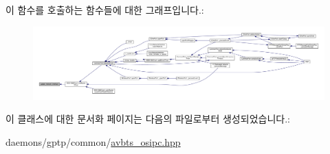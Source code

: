 이 함수를 호출하는 함수들에 대한 그래프입니다.\+:
\nopagebreak
\begin{figure}[H]
\begin{center}
\leavevmode
\includegraphics[width=350pt]{class_o_s___i_p_c_a4c9324307028ffad704ed6cb56b5a73d_icgraph}
\end{center}
\end{figure}




이 클래스에 대한 문서화 페이지는 다음의 파일로부터 생성되었습니다.\+:\begin{DoxyCompactItemize}
\item 
daemons/gptp/common/\hyperlink{avbts__osipc_8hpp}{avbts\+\_\+osipc.\+hpp}\end{DoxyCompactItemize}

